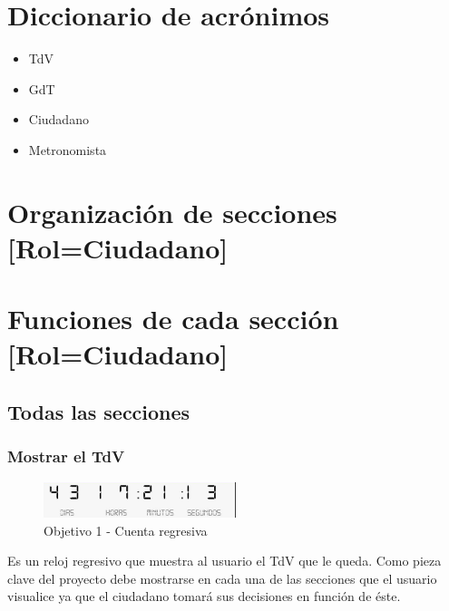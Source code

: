 \section{Diccionario de acrónimos}
\begin{itemize}
\item \ac{TdV}
\item \ac{GdT}
\item \ac{Ciudadano}
\item \ac{Metronomista}
\end{itemize}

\section{Organización de secciones [Rol=Ciudadano]}

\newpage
\section{Funciones de cada sección [Rol=Ciudadano]}

\subsection{Todas las secciones}

\subsubsection{Mostrar el TdV}
\begin{figure}[ht]
  \centering
    \includegraphics[width=0.5\textwidth]{imagenes/Objetivo1.png}
    \caption{Objetivo 1 - Cuenta regresiva}
    \label{objetivoIm1}
\end{figure}

Es un reloj regresivo que muestra al usuario el TdV que le queda. Como pieza clave del proyecto debe mostrarse en cada una de las secciones que el usuario visualice ya que el ciudadano tomará sus decisiones en función de éste.\\

